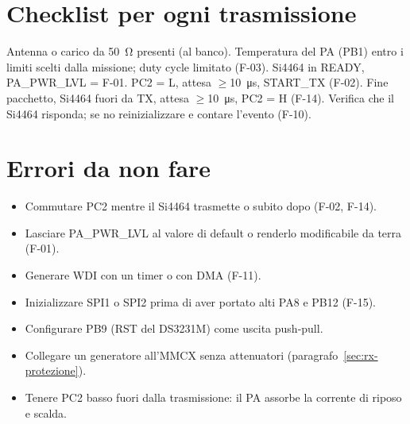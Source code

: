\section{Checklist per ogni trasmissione}
\begin{itemize}[leftmargin=8mm]
\chk Antenna o carico da \SI{50}{\ohm} presenti (al banco).
\chk Temperatura del PA (PB1) entro i limiti scelti dalla missione; duty cycle limitato (F-03).
\chk Si4464 in READY, PA\_PWR\_LVL = F-01.
\chk PC2 = L, attesa $\geq$\SI{10}{\micro\second}, START\_TX (F-02).
\chk Fine pacchetto, Si4464 fuori da TX, attesa $\geq$\SI{10}{\micro\second}, PC2 = H (F-14).
\chk Verifica che il Si4464 risponda; se no reinizializzare e contare l'evento (F-10).
\end{itemize}

\section{Errori da non fare}
\begin{attenzione}[riepilogo]
\begin{itemize}
\item Commutare PC2 mentre il Si4464 trasmette o subito dopo (F-02, F-14).
\item Lasciare PA\_PWR\_LVL al valore di default o renderlo modificabile da terra (F-01).
\item Generare WDI con un timer o con DMA (F-11).
\item Inizializzare SPI1 o SPI2 prima di aver portato alti PA8 e PB12 (F-15).
\item Configurare PB9 (RST del DS3231M) come uscita push-pull.
\item Collegare un generatore all'MMCX senza attenuatori (paragrafo~\ref{sec:rx-protezione}).
\item Tenere PC2 basso fuori dalla trasmissione: il PA assorbe la corrente di riposo e scalda.
\end{itemize}
\end{attenzione}
